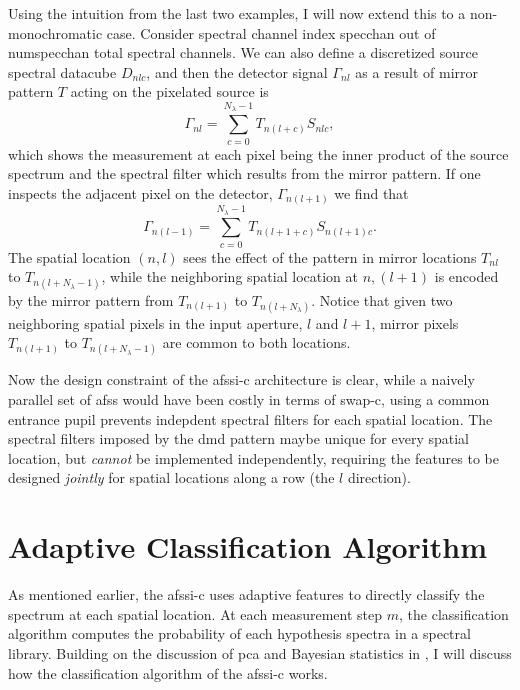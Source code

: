 Using the intuition from the last two examples, I will now extend this to a non-monochromatic case. Consider spectral channel index \gls{specchan} out of \gls{numspecchan} total spectral channels.
We can also define a discretized source spectral datacube $D_{nlc}$, and then the detector signal $\Gamma_{nl}$ as a result of mirror pattern $T$ acting on the pixelated source is
%
%
\begin{equation}
	\Gamma_{nl} = \sum^{N_{\lambda}-1}_{c = 0} T_{n \left( l + c \right)} S_{nlc},
\end{equation}
%
%
which shows the measurement at each pixel being the inner product of the source spectrum and the spectral filter which results from the mirror pattern. If one inspects the adjacent pixel on the detector, $\Gamma_{n \left(l +1 \right)}$ we find that
%
%
\begin{equation}
\Gamma_{n\left(l-1\right)} = \sum^{N_{\lambda}-1}_{c = 0} T_{n\left( l + 1 + c \right)} S_{n\left(l+1\right)c}.
\end{equation}
%
%
The spatial location $\left(n,l \right)$ sees the effect of the pattern in mirror locations $T_{nl}$ to $T_{n\left(l+N_{\lambda}-1\right)}$, while the neighboring spatial location at $n, \left( l + 1\right)$ is encoded by the mirror pattern from $T_{n\left(l+1\right)}$ to $T_{n\left(l + N_{\lambda} \right)}$. Notice that given two neighboring spatial pixels in the input aperture, $l$ and $l+1$, mirror pixels $T_{n\left( l + 1 \right)}$ to $T_{n\left(l + N_{\lambda} - 1 \right)}$ are common to both locations. 

Now the design constraint of the \gls{afssi-c} architecture is clear, while a naively parallel set of \gls{afss} would have been costly in terms of \gls{swap-c}, using a common entrance pupil prevents indepdent spectral filters for each spatial location. The spectral filters imposed by the \gls{dmd} pattern maybe unique for every spatial location, but \textit{cannot} be implemented independently, requiring the features to be designed \textit{jointly} for spatial locations along a row (the $l$ direction).



\section{Adaptive Classification Algorithm}

As mentioned earlier, the \gls{afssi-c} uses adaptive features to directly classify the spectrum at each spatial location. At each measurement step $m$, the classification algorithm computes the probability of each hypothesis spectra in a spectral library. Building on the discussion of \acrfull{pca} and Bayesian statistics in , I will discuss how the classification algorithm of the \gls{afssi-c} works. 


